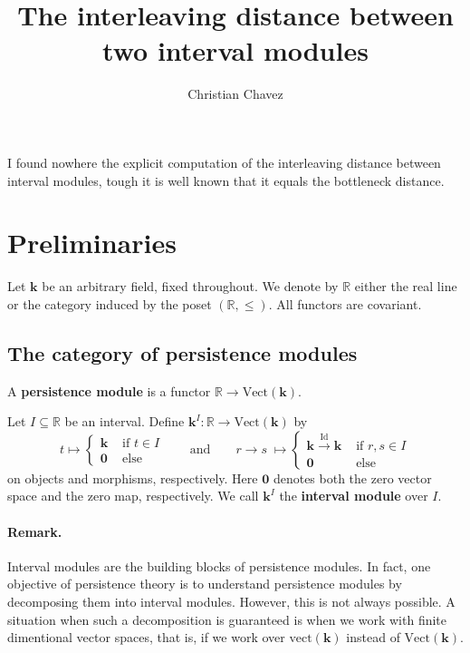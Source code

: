 \documentclass[11pt]{article}
\title{The interleaving distance between two interval modules}
\author{Christian Chavez}
\date{}
\begin{document}
\maketitle


I found nowhere the explicit computation of the interleaving distance between
interval modules, tough it is well known that it equals the bottleneck distance.
 

\section{Preliminaries}

Let \(\mathbf{k}\) be an arbitrary field, fixed throughout.
We   denote by  \(\mathbb{R}\)
either the real line or 
the category induced by the poset \((\mathbb{R},\leq)\).
All functors are covariant.

\subsection{The category of persistence modules}

A \textbf{persistence module} is a functor \(\mathbb{R}\to \mathrm{Vect}(\mathbf{k} )\).

\begin{example}[Important]
Let \(I\subseteq \mathbb{R}\) be an interval.
Define \(\mathbf{k}^I\colon \mathbb{R}\to \mathrm{Vect}(\mathbf{k} )\)
by
\[
t\mapsto \begin{cases}
\mathbf{k} &\text{ if } t\in I\\
\mathbf{0}&\text{ else }
\end{cases}
\qquad\text{and}\qquad
r\to s\; \mapsto \begin{cases}
\mathbf{k}\xrightarrow{\mathrm{Id}} \mathbf{k} &\text{ if } r,s\in I\\
\mathbf{0}&\text{ else }
\end{cases}
\]
on objects and morphisms, respectively.
Here \(\mathbf{0}\) denotes both the zero vector space and the zero map,
respectively.
We call \(\mathbf{k}^I\) the \textbf{interval module} over \(I\).

\end{example}

\paragraph{Remark.}
Interval modules are the building blocks of persistence modules.
In fact, one objective of persistence theory is to understand 
persistence modules by decomposing them into interval modules.
However, this is not always possible.
A situation when such a decomposition is   guaranteed is 
when   we work with finite dimentional vector spaces,
that is, if we work over \(\mathrm{vect}(\mathbf{k} )\)
instead of \(\mathrm{Vect}(\mathbf{k} )\).
\end{document}
